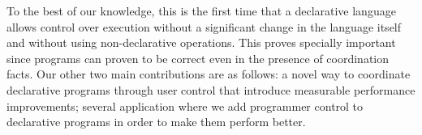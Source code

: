 To the best of our knowledge, this is the first time that a declarative language allows 
control over execution without a significant change in the language itself and
without using non-declarative operations. This proves specially important since
programs can proven to be correct even in the presence of coordination facts.
Our other two main contributions are as follows: a novel way to coordinate
declarative programs through user control that introduce measurable performance
improvements; several application where we add programmer control to declarative
programs in order to make them perform better.
